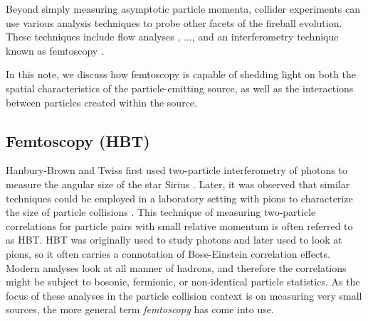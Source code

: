 




% 


Beyond simply measuring asymptotic particle momenta, collider experiments can use various analysis techniques to probe other facets of the fireball evolution.
These techniques include flow analyses \cite{...}, ..., and an interferometry technique known as femtoscopy \cite{...}.




In this note, we discuss how femtoscopy is capable of shedding light on both the spatial characteristics of the particle-emitting source, as well as the interactions between particles created within the source.




\subsection{Femtoscopy (HBT)}
\label{sec:FemtoHBT}
Hanbury-Brown and Twiss first used two-particle interferometry of photons to measure the angular size of the star Sirius \cite{HanburyBrown:1956bqd}.
Later, it was observed that similar techniques could be employed in a laboratory setting with pions to characterize the size of particle collisions \cite{Goldhaber:1960sf}.
This technique of measuring two-particle correlations for particle pairs with small relative momentum is often referred to as HBT.
HBT was originally used to study photons and later used to look at pions, so it often carries a connotation of Bose-Einstein correlation effects.
Modern analyses look at all manner of hadrons, and therefore the correlations might be subject to bosonic, fermionic, or non-identical particle statistics.
As the focus of these analyses in the particle collision context is on measuring very small sources, the more general term \textit{femtoscopy} has come into use.

